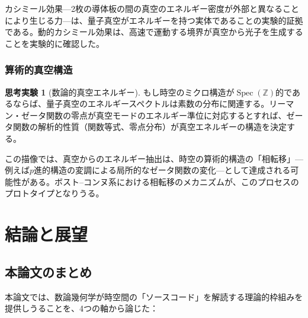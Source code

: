 \documentclass[12pt,a4paper]{ltjsarticle}
\theoremstyle{definition}
\newtheorem{thought}[definition]{思考実験}
\newcommand{\Spec}{\operatorname{Spec}}
\begin{document}
カシミール効果\cite{Casimir1948}---2枚の導体板の間の真空のエネルギー密度が外部と異なることにより生じる力---は、量子真空がエネルギーを持つ実体であることの実験的証拠である\cite{Lamoreaux1997}。動的カシミール効果\cite{Wilson2011}は、高速で運動する境界が真空から光子を生成することを実験的に確認した。

\subsubsection{算術的真空構造}

\begin{thought}[数論的真空エネルギー]
もし時空のミクロ構造が$\Spec(\mathbb{Z})$的であるならば、量子真空のエネルギースペクトルは素数の分布に関連する。リーマン・ゼータ関数の零点が真空モードのエネルギー準位に対応するとすれば、ゼータ関数の解析的性質（関数等式、零点分布）が真空エネルギーの構造を決定する。

この描像では、真空からのエネルギー抽出は、時空の算術的構造の「相転移」---例えば$p$進的構造の変調による局所的なゼータ関数の変化---として達成される可能性がある。ボスト--コンヌ系\cite{BostConnes1995}における相転移のメカニズムが、このプロセスのプロトタイプとなりうる。
\end{thought}


\newpage
\section{結論と展望}
\label{sec:conclusion}

\subsection{本論文のまとめ}

本論文では、数論幾何学が時空間の「ソースコード」を解読する理論的枠組みを提供しうることを、4つの軸から論じた：
\end{document}
